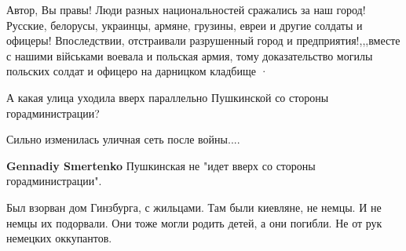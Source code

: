 \begin{itemize}
 

Автор, Вы правы! Люди разных национальностей сражались за наш город! Русские,
белорусы, украинцы, армяне, грузины, евреи и другие солдаты и офицеры!
Впоследствии, отстраивали разрушенный город и предприятия!,,,вместе с нашими
військами воевала и польская армия, тому доказательство могилы польских солдат
и офицеро на дарницком кладбище · 


 

А какая улица уходила вверх параллельно Пушкинской со стороны горадминистрации?

Сильно изменилась уличная сеть после войны....

\begin{itemize}
 
\textbf{Gennadiy Smertenko} Пушкинская не "идет вверх со стороны горадминистрации".
\end{itemize}

 

Был взорван дом Гинзбурга, с жильцами. Там были киевляне, не немцы. И не немцы
их подорвали. Они тоже могли родить детей, а они погибли. Не от рук немецких
оккупантов.
\end{itemize}

